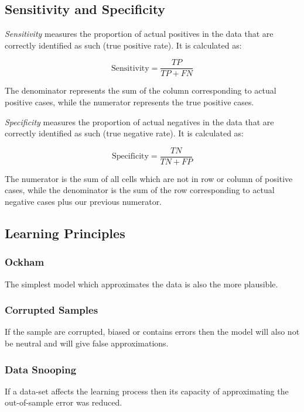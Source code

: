 \subsection{Sensitivity and Specificity}

\emph{Sensitivity} measures the proportion of actual positives in the data that are correctly identified as such (true positive rate). It is calculated as:

\[
    \text{Sensitivity} = \frac{TP}{TP + FN}
\]

The denominator represents the sum of the column corresponding to actual positive cases, while the numerator represents the true positive cases.

\emph{Specificity} measures the proportion of actual negatives in the data that are correctly identified as such (true negative rate). It is calculated as:

\[
    \text{Specificity} = \frac{TN}{TN + FP}
\]

The numerator is the sum of all cells which are not in row or column of positive cases, while the denominator is the sum of the row corresponding to actual negative cases plus 
our previous numerator.

\subsection{Learning Principles}

\subsubsection*{Ockham}

The simplest model which approximates the data is also the more plausible. 

\subsubsection*{Corrupted Samples}

If the sample are corrupted, biased or contains errors then the model will also not be neutral 
and will give false approximations.

\subsubsection*{Data Snooping}

If a data-set affects the learning process then its capacity of approximating the out-of-sample error 
was reduced. 

